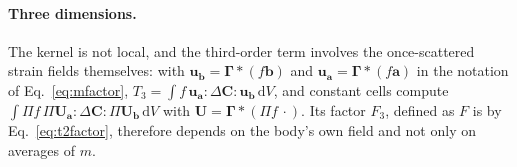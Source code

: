 \documentclass[11pt,a4paper]{article}
\newcommand{\dd}{\mathrm{d}}
\begin{document}
\paragraph{Three dimensions.} The kernel is not local, and the third-order term involves the
once-scattered strain fields themselves: with $\mathbf{u}_{\mathbf{b}}=\boldsymbol\Gamma*(f\mathbf{b})$ and
$\mathbf{u}_{\mathbf{a}}=\boldsymbol\Gamma*(f\mathbf{a})$ in the notation of Eq.~\eqref{eq:mfactor},
$T_3=\int f\,\mathbf{u}_{\mathbf{a}}:\Delta\mathbf{C}:\mathbf{u}_{\mathbf{b}}\,\dd V$, and constant cells compute
$\int\Pi f\,\Pi\mathbf{U}_{\mathbf{a}}:\Delta\mathbf{C}:\Pi\mathbf{U}_{\mathbf{b}}\,\dd V$ with
$\mathbf{U}=\boldsymbol\Gamma*(\Pi f\,\cdot)$. Its factor $F_3$, defined as $F$ is by
Eq.~\eqref{eq:t2factor}, therefore depends on the body's own field and not only on averages of $m$.
\end{document}
